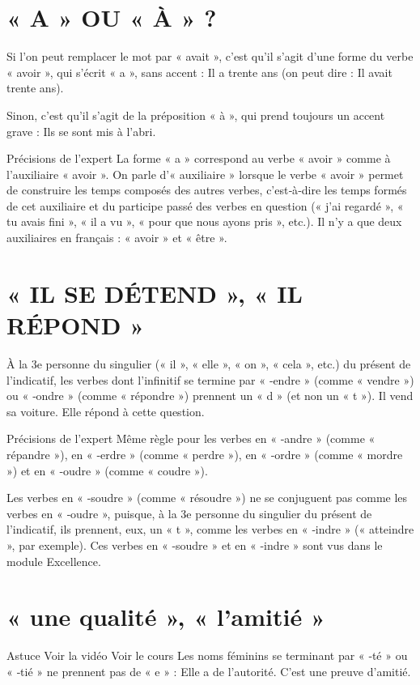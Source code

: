 \section{« A » OU « À » ?}

Si l'on peut remplacer le mot par « avait », c'est qu'il s'agit d'une forme du verbe « avoir », qui s'écrit « a », sans accent : Il a trente ans (on peut dire : Il avait trente ans).

Sinon, c'est qu'il s'agit de la préposition « à », qui prend toujours un accent grave : Ils se sont mis à l'abri.

Précisions de l'expert
La forme « a » correspond au verbe « avoir » comme à l'auxiliaire « avoir ».
On parle d'« auxiliaire » lorsque le verbe « avoir » permet de construire les temps composés des autres verbes, c'est‑à‑dire les temps formés de cet auxiliaire et du participe passé des verbes en question (« j'ai regardé », « tu avais fini », « il a vu », « pour que nous ayons pris », etc.).
Il n'y a que deux auxiliaires en français : « avoir » et « être ».

\section{« IL SE DÉTEND », « IL RÉPOND »}

À la 3e personne du singulier (« il », « elle », « on », « cela », etc.) du présent de l'indicatif, les verbes dont l'infinitif se termine par « ‑endre » (comme « vendre ») ou « ‑ondre » (comme « répondre ») prennent un « d » (et non un « t »).
Il vend sa voiture.
Elle répond à cette question.

Précisions de l'expert
Même règle pour les verbes en « ‑andre » (comme « répandre »), en « ‑erdre » (comme « perdre »), en « ‑ordre » (comme « mordre ») et en « ‑oudre » (comme « coudre »).

Les verbes en « ‑soudre » (comme « résoudre ») ne se conjuguent pas comme les verbes en « ‑oudre », puisque, à la 3e personne du singulier du présent de l'indicatif, ils prennent, eux, un « t », comme les verbes en « ‑indre » (« atteindre », par exemple).
Ces verbes en « ‑soudre » et en « ‑indre » sont vus dans le module Excellence.

\section{« une qualité », « l'amitié »}

Astuce Voir la vidéo Voir le cours
Les noms féminins se terminant par « ‑té » ou « ‑tié » ne prennent pas de « e » : Elle a de l'autorité. C'est une preuve d'amitié.

